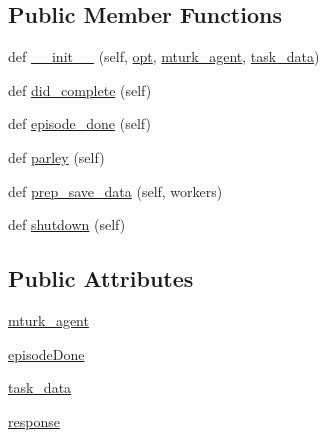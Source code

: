 \subsection*{Public Member Functions}
\begin{DoxyCompactItemize}
\item 
def \hyperlink{classparlai_1_1mturk_1_1core_1_1worlds_1_1StaticMTurkTaskWorld_a6bf4b23fee7509456b074b9587043d17}{\+\_\+\+\_\+init\+\_\+\+\_\+} (self, \hyperlink{classparlai_1_1core_1_1worlds_1_1World_a3640d92718acd3e6942a28c1ab3678bd}{opt}, \hyperlink{classparlai_1_1mturk_1_1core_1_1worlds_1_1StaticMTurkTaskWorld_a25d8cc71893b0b67169cba15f142b1bc}{mturk\+\_\+agent}, \hyperlink{classparlai_1_1mturk_1_1core_1_1worlds_1_1StaticMTurkTaskWorld_ad8f9036d50f5787b4872609a17c267e0}{task\+\_\+data})
\item 
def \hyperlink{classparlai_1_1mturk_1_1core_1_1worlds_1_1StaticMTurkTaskWorld_a2711944f83104bc843ff81293674c6ab}{did\+\_\+complete} (self)
\item 
def \hyperlink{classparlai_1_1mturk_1_1core_1_1worlds_1_1StaticMTurkTaskWorld_a07853455a3ffdc3d7142331c1d74649c}{episode\+\_\+done} (self)
\item 
def \hyperlink{classparlai_1_1mturk_1_1core_1_1worlds_1_1StaticMTurkTaskWorld_a83e09ea1d4ae320941d72b7c72897d3b}{parley} (self)
\item 
def \hyperlink{classparlai_1_1mturk_1_1core_1_1worlds_1_1StaticMTurkTaskWorld_a38d3d55c327426feb97d42c42c5cb49e}{prep\+\_\+save\+\_\+data} (self, workers)
\item 
def \hyperlink{classparlai_1_1mturk_1_1core_1_1worlds_1_1StaticMTurkTaskWorld_a793ecd56172f7bfd540b6d92887fb3f9}{shutdown} (self)
\end{DoxyCompactItemize}
\subsection*{Public Attributes}
\begin{DoxyCompactItemize}
\item 
\hyperlink{classparlai_1_1mturk_1_1core_1_1worlds_1_1StaticMTurkTaskWorld_a25d8cc71893b0b67169cba15f142b1bc}{mturk\+\_\+agent}
\item 
\hyperlink{classparlai_1_1mturk_1_1core_1_1worlds_1_1StaticMTurkTaskWorld_a2f913dd10cf988cb7e67cdc9efaa6802}{episode\+Done}
\item 
\hyperlink{classparlai_1_1mturk_1_1core_1_1worlds_1_1StaticMTurkTaskWorld_ad8f9036d50f5787b4872609a17c267e0}{task\+\_\+data}
\item 
\hyperlink{classparlai_1_1mturk_1_1core_1_1worlds_1_1StaticMTurkTaskWorld_af05fea586c5e73130cb159f6486c1855}{response}
\end{DoxyCompactItemize}


